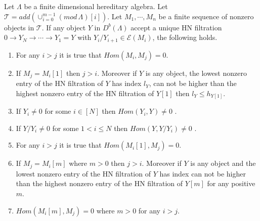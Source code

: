 \begin{lemma}\label{lem:C3L2}
Let $\Lambda$ be a finite dimensional hereditary algebra. Let $\mathcal{T} = add(\cup_{i=0}^{m-1} (mod\,\Lambda)[i])$. Let $M_1,\cdots, M_n$ be a finite sequence of nonzero objects in $\mathcal{T}$. If any object $Y$ in $D^b(\Lambda)$ accept a unique HN filtration $0\to Y_N\to\cdots\to Y_1=Y$ with $Y_i/Y_{i+1}\in \mathcal{E}(M_i)$, the following holds.
\begin{enumerate}
\item For any $i>j$ it is true that $Hom(M_i,M_j) = 0$.
\item If $M_j = M_i[1]$ then $j>i$. Moreover if $Y$ is any object, the lowest nonzero entry of the HN filtration of $Y$ has index $l_Y$, can not be higher than the highest nonzero entry of the HN filtration of $Y[1]$ then $l_Y\leq h_{Y[1]}$.
\item If $Y_i\neq 0$ for some $i\in[N]$ then $Hom(Y_i, Y)\neq 0$ .
\item If $Y/Y_i\neq 0$ for some $1<i\leq N$ then $Hom(Y, Y/Y_i)\neq 0$ .
\item For any $i>j$ it is true that $Hom(M_i[1],M_j) = 0$.
\item If $M_j = M_i[m]$ where $m>0$ then $j>i$. Moreover if $Y$ is any object and the lowest nonzero entry of the HN filtration of $Y$ has index can not be higher than the highest nonzero entry of the HN filtration of $Y[m]$ for any positive $m$. 
\item $Hom(M_i[m],M_j) = 0$ where $m>0$ for any $i>j$.
\end{enumerate}
\end{lemma}
